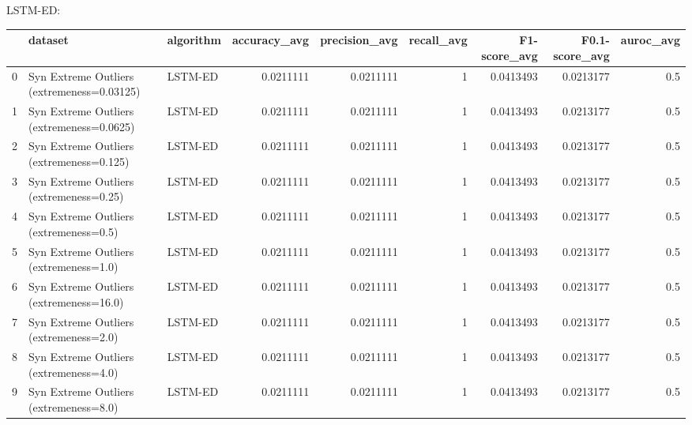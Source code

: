 LSTM-ED:

\begin{tabular}{rllrrrrrr}
\hline
    & dataset                                    & algorithm   &   accuracy\_avg &   precision\_avg &   recall\_avg &   F1-score\_avg &   F0.1-score\_avg &   auroc\_avg \\
\hline
  0 & Syn Extreme Outliers (extremeness=0.03125) & LSTM-ED     &      0.0211111 &       0.0211111 &            1 &      0.0413493 &        0.0213177 &         0.5 \\
  1 & Syn Extreme Outliers (extremeness=0.0625)  & LSTM-ED     &      0.0211111 &       0.0211111 &            1 &      0.0413493 &        0.0213177 &         0.5 \\
  2 & Syn Extreme Outliers (extremeness=0.125)   & LSTM-ED     &      0.0211111 &       0.0211111 &            1 &      0.0413493 &        0.0213177 &         0.5 \\
  3 & Syn Extreme Outliers (extremeness=0.25)    & LSTM-ED     &      0.0211111 &       0.0211111 &            1 &      0.0413493 &        0.0213177 &         0.5 \\
  4 & Syn Extreme Outliers (extremeness=0.5)     & LSTM-ED     &      0.0211111 &       0.0211111 &            1 &      0.0413493 &        0.0213177 &         0.5 \\
  5 & Syn Extreme Outliers (extremeness=1.0)     & LSTM-ED     &      0.0211111 &       0.0211111 &            1 &      0.0413493 &        0.0213177 &         0.5 \\
  6 & Syn Extreme Outliers (extremeness=16.0)    & LSTM-ED     &      0.0211111 &       0.0211111 &            1 &      0.0413493 &        0.0213177 &         0.5 \\
  7 & Syn Extreme Outliers (extremeness=2.0)     & LSTM-ED     &      0.0211111 &       0.0211111 &            1 &      0.0413493 &        0.0213177 &         0.5 \\
  8 & Syn Extreme Outliers (extremeness=4.0)     & LSTM-ED     &      0.0211111 &       0.0211111 &            1 &      0.0413493 &        0.0213177 &         0.5 \\
  9 & Syn Extreme Outliers (extremeness=8.0)     & LSTM-ED     &      0.0211111 &       0.0211111 &            1 &      0.0413493 &        0.0213177 &         0.5 \\
\hline
\end{tabular}

